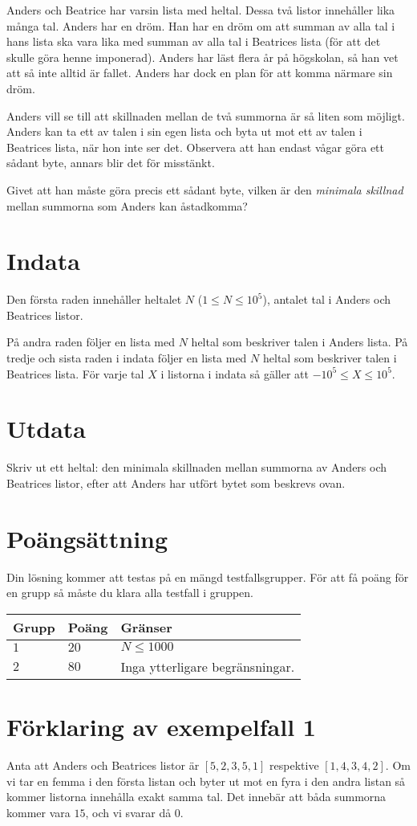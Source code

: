 
Anders och Beatrice har varsin lista med heltal. Dessa två listor innehåller lika många tal. Anders har en dröm. Han har en dröm om att summan av alla tal i hans lista ska vara lika med summan av alla tal i Beatrices lista (för att det skulle göra henne imponerad). Anders har läst flera år på högskolan, så han vet att så inte alltid är fallet. Anders har dock en plan för att komma närmare sin dröm.

Anders vill se till att skillnaden mellan de två summorna är så liten som möjligt. Anders kan ta ett av talen i sin egen lista och byta ut mot ett av talen i Beatrices lista, när hon inte ser det. Observera att han endast vågar göra ett sådant byte, annars blir det för misstänkt.

Givet att han måste göra precis ett sådant byte, vilken är den \emph{minimala skillnad} mellan summorna som Anders kan åstadkomma?

\section*{Indata}
Den första raden innehåller heltalet $N$ ($1 \leq N \leq 10^5$), antalet tal i Anders och Beatrices listor.

På andra raden följer en lista med $N$ heltal som beskriver talen i Anders lista. På tredje och sista raden i indata följer en lista med $N$ heltal som beskriver talen i Beatrices lista. För varje tal $X$ i listorna i indata så gäller att $-10^5 \leq X \leq 10^5$.

\section*{Utdata}
Skriv ut ett heltal: den minimala skillnaden mellan summorna av Anders och Beatrices listor, efter att Anders har utfört bytet som beskrevs ovan.

\section*{Poängsättning}
Din lösning kommer att testas på en mängd testfallsgrupper.
För att få poäng för en grupp så måste du klara alla testfall i gruppen.

\noindent
\begin{tabular}{| l | l | p{12cm} |}
  \hline
  \textbf{Grupp} & \textbf{Poäng} & \textbf{Gränser} \\ \hline
  $1$    & $20$       & $N \leq 1000$ \\ \hline
  $2$    & $80$       & Inga ytterligare begränsningar. \\ \hline
\end{tabular}


\section*{Förklaring av exempelfall 1}
Anta att Anders och Beatrices listor är $[5,2,3,5,1]$ respektive $[1,4,3,4,2]$. Om vi tar en femma
i den första listan och byter ut mot en fyra i den andra listan så kommer listorna innehålla exakt
samma tal. Det innebär att båda summorna kommer vara $15$, och vi svarar då $0$.

